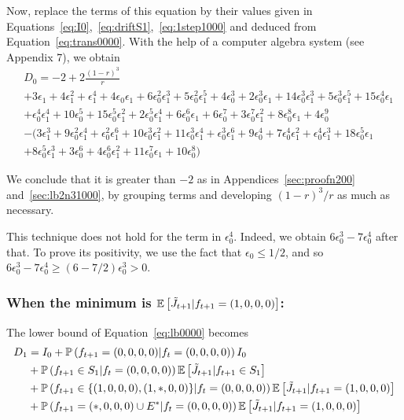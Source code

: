 \documentclass[11pt]{article}
\theoremstyle{plain}
\theoremstyle{definition}
\theoremstyle{remark}
\newcommand{\prob}[1]{\mathbb{P}\left( #1 \right)}
\newcommand{\esp}[1]{\mathbb{E}\left[ #1 \right]}
\begin{document}
Now, replace the terms of this equation by their values given in Equations~\eqref{eq:I0},~\eqref{eq:driftS1},~\eqref{eq:1step1000} and deduced from Equation~\eqref{eq:trans0000}. With the help of a computer algebra system (see Appendix 7), we obtain
\begin{align*}
& D_0 = -2 + 2 \frac{(1-r)^3}{r}\\
& + 3 \epsilon_1 + 4 \epsilon_1^2 +\epsilon_1^4 + 4 \epsilon_0 \epsilon_1 + 6 \epsilon_0^2 \epsilon_1^3 + 5 \epsilon_0^2 \epsilon_1^5  + 4 \epsilon_0^3 + 2 \epsilon_0^3 \epsilon_1 + 14 \epsilon_0^3 \epsilon_1^3 + 5 \epsilon_0^3 \epsilon_1^5 +15 \epsilon_0^4 \epsilon_1 \\
& + \epsilon_0^4 \epsilon_1^4  + 10 \epsilon_0^5 + 15 \epsilon_0^5 \epsilon_1^2 + 2 \epsilon_0^5 \epsilon_1^4 + 6 \epsilon_0^6 \epsilon_1 + 6 \epsilon_0^7 + 3 \epsilon_0^7 \epsilon_1^2 + 8 \epsilon_0^8 \epsilon_1 + 4 \epsilon_0^9\\
& - (3\epsilon_1^3 + 9 \epsilon_0^2 \epsilon_1^4 + \epsilon_0^2 \epsilon_1^6 + 10 \epsilon_0^3 \epsilon_1^2 + 11 \epsilon_0^3 \epsilon_1^4 + \epsilon_0^3 \epsilon_1^6 + 9 \epsilon_0^4  + 7 \epsilon_0^4 \epsilon_1^2 + \epsilon_0^4 \epsilon_1^3 + 18 \epsilon_0^5 \epsilon_1 \\
& + 8 \epsilon_0^5 \epsilon_1^3 + 3 \epsilon_0^6 + 4 \epsilon_0^6 \epsilon_1^2 + 11 \epsilon_0^7 \epsilon_1  + 10 \epsilon_0^8) 
\end{align*}

We conclude that it is greater than $-2$ as in Appendices~\ref{sec:proofn200} and~\ref{sec:lb2n31000}, by grouping terms and developing $(1-r)^3/r$ as much as necessary. 

This technique does not hold for the term in $\epsilon_0^4$. Indeed, we obtain $6 \epsilon_0^3 - 7 \epsilon_0^4$ after that. To prove its positivity, we use the fact that $\epsilon_0 \leq 1/2$, and so $6 \epsilon_0^3 - 7 \epsilon_0^4 \geq (6-7/2) \epsilon_0^3 > 0$.

\subsubsection{When the minimum is $\esp{\Tilde{J}_{t+1}|f_{t+1}=(1,0,0,0)}$:}
The lower bound of Equation~\eqref{eq:lb0000} becomes
\begin{align*}
D_1 & = I_0 + \prob{f_{t+1}=(0,0,0,0) |f_t=(0,0,0,0)} I_0 \nonumber \\
& + \prob{f_{t+1} \in S_1 | f_t = (0,0,0,0)} \esp{\Tilde{J}_{t+1}| f_{t+1} \in S_1} \nonumber \\
& + \prob{f_{t+1} \in \{(1,0,0,0),(1,*,0,0)\} |f_t=(0,0,0,0)} \esp{\Tilde{J}_{t+1}|f_{t+1}=(1,0,0,0)} \nonumber\\
& + \prob{f_{t+1}=(*,0,0,0) \cup E^* |f_t=(0,0,0,0)} \esp{\Tilde{J}_{t+1}|f_{t+1}=(1,0,0,0)}
\end{align*}
\end{document}
